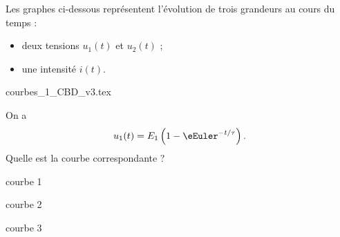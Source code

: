 \newpage



\hauteurLargeurCadreReponse		{6mm}{2.5cm}
\initialisationEntrainement

Les graphes ci-dessous représentent l'évolution de trois grandeurs au cours du temps : 
\begin{itemize}
\item deux tensions $u_1(t)$ et $u_2(t)$ ;
\item une intensité $i(t)$. 
\end{itemize}

\begin{center}
{courbes_1_CBD_v3.tex}
\end{center}

\medskip

\debutEntrainement


\begin{enonce}
On a 
\[
u_1(t)=E_1\left(1-\eEuler^{-t/\tau}\right).
\] 
Quelle est la courbe correspondante ?
\begin{listeQCM3Colonnes}
\item courbe 1
\item courbe 2
\item courbe 3
\end{listeQCM3Colonnes}
\medskip
\end{enonce}

\reponse{\reponseB}



